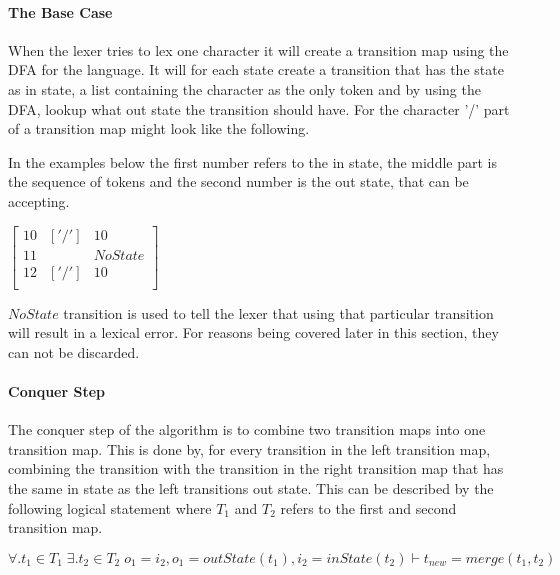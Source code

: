 \paragraph{The Base Case}
When the lexer tries to lex one character it will create a transition
map using the DFA for the language. It will for each state create a transition
that has the state as in state, a list containing the character as the only
token and by using the DFA, lookup what out state the transition should have.
For the character '/' part of a transition map might look like the following.

In the
examples below the first number refers to the in state, the middle part is the
sequence of tokens and the second number is the out state, that can be accepting.
\begin{center}
$\left[\begin{array}{ccc}
10&['/']&10\\
11& &NoState\\
12&['/']&10\\
\end{array}\right]$
\end{center}
$NoState$ transition is used to tell the lexer that using that particular 
transition will result in a lexical error. For reasons being covered later in
this section, they can not be discarded.

\paragraph{Conquer Step}
The conquer step of the algorithm is to combine two transition maps into one
transition map. This is done by, for every transition in the left transition map, combining
the transition with the transition in the right transition map that has the same in state as the
left transitions out state. This can be described by the following logical statement where $T_1$ and $T_2$ refers to the first and second transition map.
\begin{center}
$\forall.t_1\in T_1\;\exists.t_2\in T_2\;o_1=i_2,o_1=outState(t_1),i_2=inState(t_2)
\vdash t_{new}=merge(t_1,t_2)$
\end{center}

